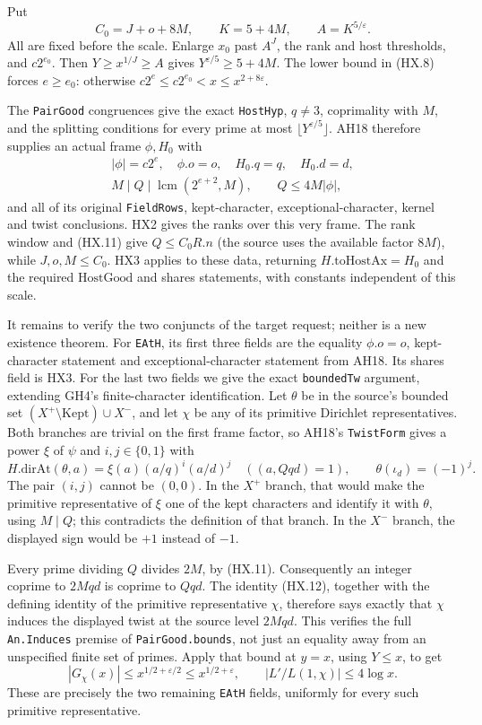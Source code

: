 Put
\[
 C_0=J+o+8M,\qquad K=5+4M,\qquad A=K^{5/\varepsilon}.
 \tag{HX.10}
\]
All are fixed before the scale.  Enlarge $x_0$ past $A^J$, the
rank and host thresholds, and $c2^{e_0}$.  Then
$Y\ge x^{1/J}\ge A$ gives $Y^{\varepsilon/5}\ge5+4M$.
The lower bound in (HX.8) forces $e\ge e_0$: otherwise
$c2^e\le c2^{e_0}<x\le x^{2+8\varepsilon}$.

The \texttt{PairGood} congruences give the exact \texttt{HostHyp},
$q\ne3$, coprimality with $M$, and the splitting conditions for
every prime at most $\lfloor Y^{\varepsilon/5}\rfloor$.
AH18 therefore supplies an actual frame $\phi,H_0$ with
\[
 \begin{gathered}
 |\phi|=c2^e,\quad\phi.o=o,\quad H_0.q=q,\quad H_0.d=d,\\
 M\mid Q\mid\operatorname{lcm}(2^{e+2},M),\qquad
 Q\le4M|\phi|,
 \end{gathered}
 \tag{HX.11}
\]
and all of its original \texttt{FieldRows}, kept-character,
exceptional-character, kernel and twist conclusions.  HX2 gives
the ranks over this very frame.  The rank window and (HX.11)
give $Q\le C_0R.n$ (the source uses the available factor $8M$),
while $J,o,M\le C_0$.  HX3 applies to these data, returning
$H.\mathrm{toHostAx}=H_0$ and the required $\mathrm{HostGood}$
and shares statements, with constants independent of this scale.

It remains to verify the two conjuncts of the target request;
neither is a new existence theorem.  For \texttt{EAtH}, its first
three fields are the equality $\phi.o=o$, kept-character statement
and exceptional-character statement from AH18.  Its shares field
is HX3.  For the last two fields we give the exact
\texttt{boundedTw} argument, extending GH4's finite-character
identification.  Let $\theta$ be in the source's bounded set
$(X^+\setminus\mathrm{Kept})\cup X^-$, and let $\chi$ be any
of its primitive Dirichlet representatives.  Both branches are
trivial on the first frame factor, so AH18's \texttt{TwistForm}
gives a power $\xi$ of $\psi$ and $i,j\in\{0,1\}$ with
\[
 H.\mathrm{dirAt}(\theta,a)=\xi(a)(a/q)^i(a/d)^j
       \quad((a,Qqd)=1),\qquad
 \theta(\iota_d)=(-1)^j.
 \tag{HX.12}
\]
The pair $(i,j)$ cannot be $(0,0)$.  In the $X^+$ branch, that
would make the primitive representative of $\xi$ one of the
kept characters and identify it with $\theta$, using $M\mid Q$;
this contradicts the definition of that branch.  In the $X^-$
branch, the displayed sign would be $+1$ instead of $-1$.

Every prime dividing $Q$ divides $2M$, by (HX.11).
Consequently an integer coprime to $2Mqd$ is coprime to $Qqd$.
The identity (HX.12), together with the defining identity of the
primitive representative $\chi$, therefore says exactly that
$\chi$ induces the displayed twist at the source level $2Mqd$.
This verifies the full \texttt{An.Induces} premise of
\texttt{PairGood.bounds}, not just an equality away from an
unspecified finite set of primes.  Apply that bound at $y=x$,
using $Y\le x$, to get
\[
 |G_\chi(x)|\le x^{1/2+\varepsilon/2}
                   \le x^{1/2+\varepsilon},\qquad
 |L'/L(1,\chi)|\le4\log x.
 \tag{HX.13}
\]
These are precisely the two remaining \texttt{EAtH} fields,
uniformly for every such primitive representative.

